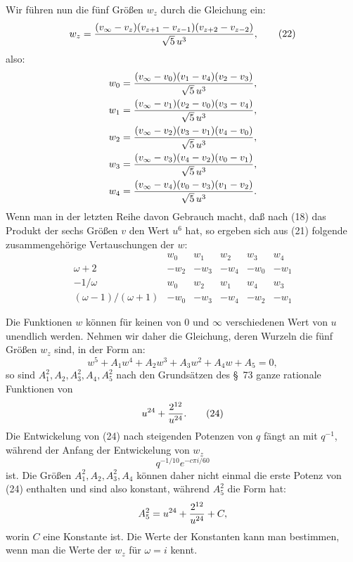 \documentclass[11pt]{article}
\begin{document}
Wir führen nun die fünf Größen \(w_z\) durch die Gleichung ein:
\begin{equation}
 w_z={(v_\infty-v_z)(v_{z+1}-v_{z-1})(v_{z+2}-v_{z-2})\over \sqrt5\,u^3},
\tag{22}
\end{equation}
also:
\[
\begin{aligned}
w_0&={(v_\infty-v_0)(v_1-v_4)(v_2-v_3)\over\sqrt5\,u^3},\\
w_1&={(v_\infty-v_1)(v_2-v_0)(v_3-v_4)\over\sqrt5\,u^3},\\
w_2&={(v_\infty-v_2)(v_3-v_1)(v_4-v_0)\over\sqrt5\,u^3},\\
w_3&={(v_\infty-v_3)(v_4-v_2)(v_0-v_1)\over\sqrt5\,u^3},\\
w_4&={(v_\infty-v_4)(v_0-v_3)(v_1-v_2)\over\sqrt5\,u^3}.
\end{aligned}
\]
Wenn man in der letzten Reihe davon Gebrauch macht, daß nach (18) das Produkt der sechs Größen \(v\) den Wert \(u^6\) hat, so ergeben sich aus (21) folgende zusammengehörige Vertauschungen der \(w\):
\begin{equation}
\begin{array}{c|ccccc}
& w_0&w_1&w_2&w_3&w_4\\ \hline
\omega+2&-w_2&-w_3&-w_4&-w_0&-w_1\\
-1/\omega&w_0&w_2&w_1&w_4&w_3\\
(\omega-1)/(\omega+1)&-w_0&-w_3&-w_4&-w_2&-w_1
\end{array}
\tag{23}
\end{equation}

Die Funktionen \(w\) können für keinen von \(0\) und \(\infty\) verschiedenen Wert von \(u\) unendlich werden. Nehmen wir daher die Gleichung, deren Wurzeln die fünf Größen \(w_z\) sind, in der Form an:
\[
 w^5+A_1w^4+A_2w^3+A_3w^2+A_4w+A_5=0,
\]
so sind \(A_1^2,A_2,A_3^2,A_4,A_5^2\) nach den Grundsätzen des \S~73 ganze rationale Funktionen von
\begin{equation}
 u^{24}+{2^{12}\over u^{24}}.
\tag{24}
\end{equation}
Die Entwickelung von (24) nach steigenden Potenzen von \(q\) fängt an mit \(q^{-1}\), während der Anfang der Entwickelung von \(w_z\)
\[
 q^{-1/10}e^{-c\pi i/60}
\]
ist. Die Größen \(A_1^2,A_2,A_3^2,A_4\) können daher nicht einmal die erste Potenz von (24) enthalten und sind also konstant, während \(A_5^2\) die Form hat:
\[
 A_5^2=u^{24}+{2^{12}\over u^{24}}+C,
\]
worin \(C\) eine Konstante ist. Die Werte der Konstanten kann man bestimmen, wenn man die Werte der \(w_z\) für \(\omega=i\) kennt.
\end{document}
